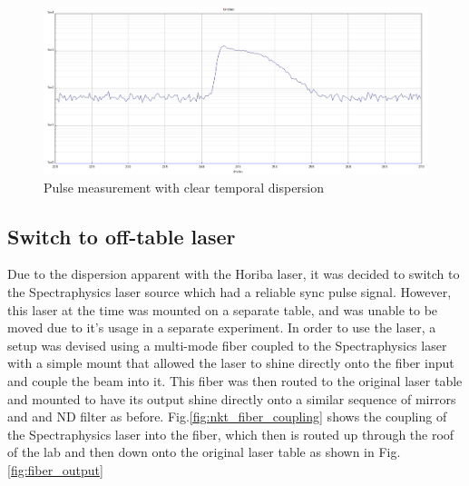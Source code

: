 \documentclass[a4paper]{article}
\begin{document}
\begin{figure}
\centering
\includegraphics[width=1.0\textwidth]{horiba laser.PNG}
\caption{\label{fig:pulse_1}Pulse measurement with clear temporal dispersion}
\end{figure}

\subsection{Switch to off-table laser}

Due to the dispersion apparent with the Horiba laser, it was decided to switch to the Spectraphysics laser source which had a reliable sync pulse signal. However, this laser at the time was mounted on a separate table, and was unable to be moved due to it's usage in a separate experiment. In order to use the laser, a setup was devised using a multi-mode fiber coupled to the Spectraphysics laser with a simple mount that allowed the laser to shine directly onto the fiber input and couple the beam into it. This fiber was then routed to the original laser table and mounted to have its output shine directly onto a similar sequence of mirrors and and ND filter as before. Fig.\ref{fig:nkt_fiber_coupling} shows the coupling of the Spectraphysics laser into the fiber, which then is routed up through the roof of the lab and then down onto the original laser table as shown in Fig.\ref{fig:fiber_output}
\end{document}
